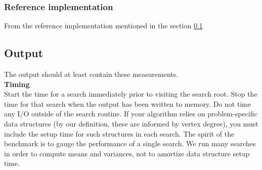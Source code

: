 \subsubsection{Reference implementation}
\label{med:ref}

From the reference implementation mentioned in the section \ref{}


\subsection{Output}
The output should at least contain these measurements. \\ 
\textbf{Timing} \\
Start the time for a search immediately prior to visiting the search root. Stop the time for that search when the output has been written to memory. Do not time any I/O outside of the search routine. If your algorithm relies on problem-specific data structures (by our definition, these are informed by vertex degree), you must include the setup time for such structures in each search. The spirit of the benchmark is to gauge the performance of a single search. We run many searches in order to compute means and variances, not to amortize data structure setup time.


